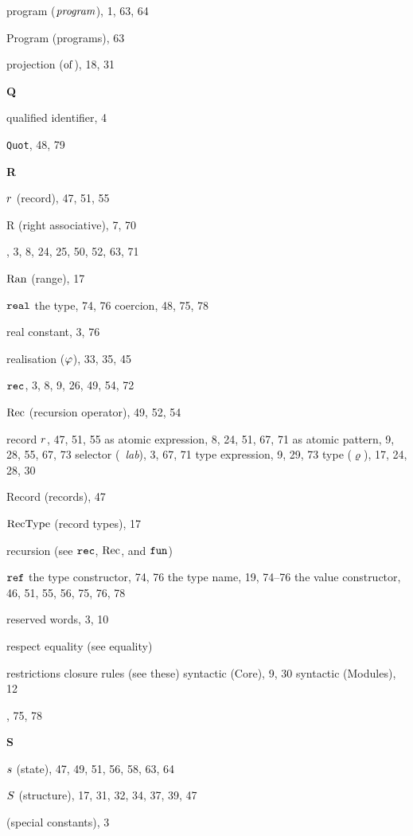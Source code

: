 \begin{theindex}
\item program ($\program$), 1, 63, 64
\item Program (programs), 63
\item projection ($\of{}{}$), 18, 31
\indexspace
\parbox{65mm}{\hfil{\large\bf Q}\hfil}
\indexspace
\item qualified identifier, 4
\item {\tt Quot}, 48, 79
\indexspace
\parbox{65mm}{\hfil{\large\bf R}\hfil}
\indexspace
\item $\r$ (record), 47, 51, 55
\item R (right associative), 7, 70
\item \RAISE, 3, 8, 24, 25, 50, 52, 63, 71
\item $\Ran$ (range), 17
\item $\REAL$ 
\subitem the type, 74, 76
\subitem coercion, 48, 75, 78
\item real constant, 3, 76
\item realisation ($\rea$), 33, 35, 45
\item $\REC$, 3, 8, 9, 26, 49, 54, 72
\item $\Rec$ (recursion operator), 49, 52, 54
\item record  
\subitem $\r$, 47, 51, 55
\subitem as atomic expression, 8, 24, 51, 67, 71
\subitem as atomic pattern, 9, 28, 55, 67, 73
\subitem selector (\ml{\#}\ {\it lab}), 3, 67, 71
\subitem type expression, 9, 29, 73
\subitem type ($\varrho$), 17, 24, 28, 30
\item Record (records), 47
\item $\RecType$ (record types), 17
\item recursion (see $\REC$, $\Rec$, and $\FUN$) 
\item $\REF$ 
\subitem the type constructor, 74, 76
\subitem the type name, 19, 74--76
\subitem the value constructor, 46, 51, 55, 56, 75, 76, 78
\item reserved words, 3, 10
\item respect equality (see equality) 
\item restrictions 
\subitem closure rules (see these) 
\subitem syntactic (Core), 9, 30
\subitem syntactic (Modules), 12
\item {}, 75, 78
\indexspace
\parbox{65mm}{\hfil{\large\bf S}\hfil}
\indexspace
\item $\s$ (state), 47, 49, 51, 56, 58, 63, 64
\item $\S$ (structure), 17, 31, 32, 34, 37, 39, 47
\item {\SCon} (special constants), 3

\end{theindex}
